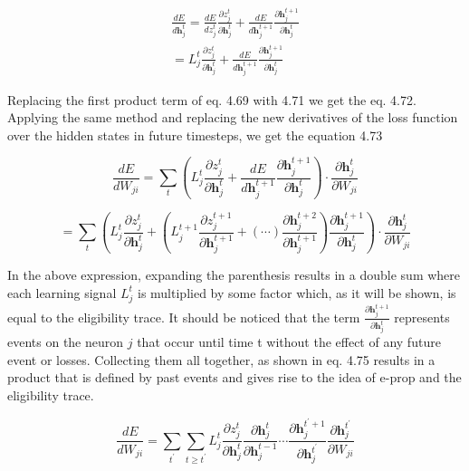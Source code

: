 \documentclass[12pt]{report}
\begin{document}
\begin{align}
    \frac{d E}{d \mathbf{h}_{j}^{t}}=\frac{d E}{d z_{j}^{t}} \frac{\partial z_{j}^{t}}{\partial \mathbf{h}_{j}^{t}}+\frac{d E}{d \mathbf{h}_{j}^{t+1}} \frac{\partial \mathbf{h}_{j}^{t+1}}{\partial \mathbf{h}_{j}^{t}} \\
    =L_j^t\frac{\partial z_{j}^{t}}{\partial \mathbf{h}_{j}^{t}}+\frac{d E}{d \mathbf{h}_{j}^{t+1}} \frac{\partial \mathbf{h}_{j}^{t+1}}{\partial \mathbf{h}_{j}^{t}}
\end{align}

Replacing the first product term of eq. 4.69 with 4.71 we get the eq. 4.72. Applying the same method and replacing the new derivatives of the loss function over the hidden states in future timesteps, we get the equation 4.73

\begin{equation}
    \frac{d E}{d W_{j i}}=\sum_{t}\left(L_{j}^{t} \frac{\partial z_{j}^{t}}{\partial \mathbf{h}_{j}^{t}}+\frac{d E}{d \mathbf{h}_{j}^{t+1}} \frac{\partial \mathbf{h}_{j}^{t+1}}{\partial \mathbf{h}_{j}^{t}}\right) \cdot \frac{\partial \mathbf{h}_{j}^{t}}{\partial W_{j i}} 
\end{equation}

\begin{equation}
    =\sum_{t}\left(L_{j}^{t} \frac{\partial z_{j}^{t}}{\partial \mathbf{h}_{j}^{t}}+\left(L_{j}^{t+1} \frac{\partial z_{j}^{t+1}}{\partial \mathbf{h}_{j}^{t+1}}+(\cdots) \frac{\partial \mathbf{h}_{j}^{t+2}}{\partial \mathbf{h}_{j}^{t+1}}\right) \frac{\partial \mathbf{h}_{j}^{t+1}}{\partial \mathbf{h}_{j}^{t}}\right) \cdot \frac{\partial \mathbf{h}_{j}^{t}}{\partial W_{j i}}
\end{equation}

In the above expression, expanding the parenthesis results in a double sum where each learning signal \(L_j^t\) is multiplied by some factor which, as it will be shown, is equal to the eligibility trace. It should be noticed that the term \(\frac{\partial \mathbf{h}_{j}^{t+1}}{\partial \mathbf{h}_{j}^{t}}\) represents events on the neuron \(j\) that occur until time t without the effect of any future event or losses. Collecting them all together, as shown in eq. 4.75 results in a product that is defined by past events and gives rise to the idea of e-prop and the eligibility trace.

\begin{equation}
    \frac{d E}{d W_{j i}}=\sum_{t^\prime}\sum_{t\geq t^\prime}L_{j}^{t} \frac{\partial z_{j}^{t}}{\partial \mathbf{h}_{j}^{t}}\frac{\partial \mathbf{h}_{j}^{t}}{\partial \mathbf{h}_{j}^{t-1}} \cdots \frac{\partial \mathbf{h}_{j}^{t^\prime + 1}}{\partial \mathbf{h}_{j}^{t^\prime}} \frac{\partial \mathbf{h}_{j}^{t^\prime}}{\partial W_{j i}} 
\end{equation}
\end{document}
